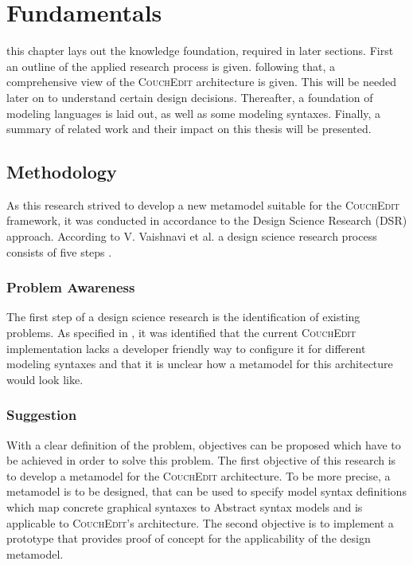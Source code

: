 \chapter{Fundamentals}
\label{ch:fundamentals}

this chapter lays out the knowledge foundation, required in later sections. First an outline of the applied research process is given. following that, a comprehensive view of the \textsc{CouchEdit} architecture is given. This will be needed later on to understand certain design decisions. Thereafter, a foundation of modeling languages is laid out, as well as some modeling syntaxes. Finally, a summary of related work and their impact on this thesis will be presented. 

\section{Methodology}
As this research strived to develop a new metamodel suitable for the \textsc{CouchEdit} framework, it was conducted in accordance to the Design Science Research (DSR) approach. According to V. Vaishnavi et al. a design science research process consists of five steps \cite{vaishnavi_design_2004}.

\subsection{Problem Awareness}
The first step of a design science research is the identification of existing problems. As specified in , it was identified that the current \textsc{CouchEdit} implementation lacks a developer friendly way to configure it for different modeling syntaxes and that it is unclear how a metamodel for this architecture would look like.

\subsection{Suggestion}
With a clear definition of the problem, objectives can be proposed which have to be achieved in order to solve this problem. The first objective of this research is to develop a metamodel for the \textsc{CouchEdit} architecture. To be more precise, a metamodel is to be designed, that can be used to specify model syntax definitions which map concrete graphical syntaxes to Abstract syntax models and is applicable to \textsc{CouchEdit}'s architecture. The second objective is to implement a prototype that provides proof of concept for the applicability of the design metamodel.


